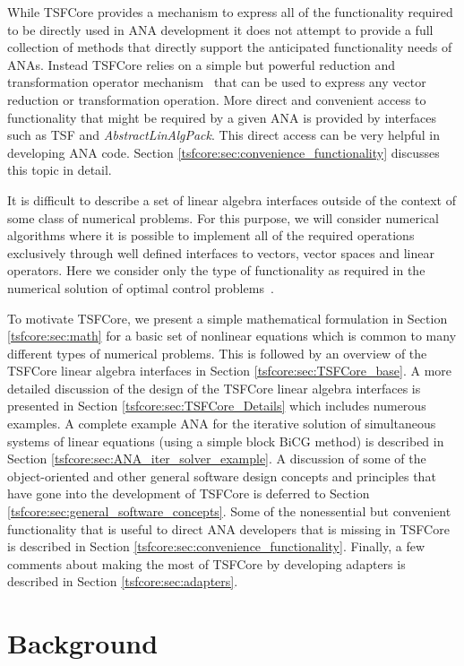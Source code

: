 \documentclass[10pt,fleqn]{article}
\begin{document}
While TSFCore provides a mechanism to express 
all of the functionality required to be directly used in ANA
development it does not attempt to provide a full collection of 
methods that directly support the anticipated functionality
needs of ANAs.  Instead TSFCore relies on a simple but powerful 
reduction and transformation operator mechanism~\cite{ref:rtop_toms}
that can be used to express any vector reduction or transformation 
operation.  More direct and convenient access to functionality that might be 
required by a given ANA is 
provided by interfaces such as TSF and \textit{AbstractLinAlgPack}. 
This direct access can be very helpful in developing ANA code.
Section \ref{tsfcore:sec:convenience_functionality} discusses this topic
in detail.

It is difficult to describe a set of linear algebra interfaces outside
of the context of some class of numerical problems.  For this purpose,
we will consider numerical algorithms where it is possible to implement
all of the required operations exclusively through well defined interfaces
to vectors, vector spaces and linear operators.  Here we consider
only the type of functionality as required in the numerical solution
of optimal control problems~\cite{ref:opt_ctrl_itfc}.

To motivate TSFCore, we present a simple mathematical formulation in
Section \ref{tsfcore:sec:math} for a basic set of nonlinear equations
which is common to many different types of numerical problems.  This
is followed by an overview of the TSFCore linear algebra interfaces in
Section \ref{tsfcore:sec:TSFCore_base}.  A more detailed discussion of
the design of the TSFCore linear algebra interfaces is presented in
Section \ref{tsfcore:sec:TSFCore_Details} which includes numerous
examples.  A complete example ANA for the iterative solution of
simultaneous systems of linear equations (using a simple block BiCG
method) is described in Section
\ref{tsfcore:sec:ANA_iter_solver_example}.  A discussion of some of the
object-oriented and other general software design concepts and
principles that have gone into the development of TSFCore is deferred
to Section \ref{tsfcore:sec:general_software_concepts}.  Some of the
nonessential but convenient functionality that is useful to direct ANA
developers that is missing in TSFCore is described in Section
\ref{tsfcore:sec:convenience_functionality}. Finally, a few comments
about making the most of TSFCore by developing adapters is described in
Section \ref{tsfcore:sec:adapters}.

%
\section{Background}
\label{tsfcore:sec:background}
%
\end{document}
